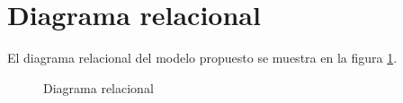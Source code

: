 \section{Diagrama relacional}\label{sec:diagrama-relacional}
El diagrama relacional del modelo propuesto se muestra en la figura \ref{fig:Diagrama Relacional}.

\begin{landscape}
\begin{figure}[H]
\centering
\caption{Diagrama relacional}\label{fig:Diagrama Relacional}   
\end{figure}
\end{landscape}